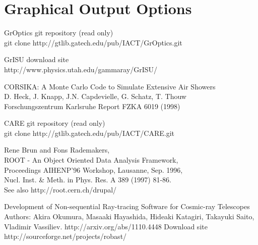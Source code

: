 \documentclass{article}
\begin{document}
\section{Graphical Output Options}\label{S:GRAPH}

\begin{thebibliography}{4}
    GrOptics git repository (read only) \\
    git clone http://gtlib.gatech.edu/pub/IACT/GrOptics.git

    GrISU download site \\
    http://www.physics.utah.edu/gammaray/GrISU/

    CORSIKA: A Monte Carlo Code to Simulate Extensive Air Showers\\
    D. Heck, J. Knapp, J.N. Capdevielle, G. Schatz, T. Thouw \\
    Forschungszentrum Karlsruhe Report FZKA 6019 (1998)

   CARE git repository (read only) \\
   git clone http://gtlib.gatech.edu/pub/IACT/CARE.git

   Rene Brun and Fons Rademakers,\\
   ROOT - An Object Oriented Data Analysis Framework,\\
   Proceedings AIHENP'96 Workshop, Lausanne, Sep. 1996, \\
   Nucl. Inst. \& Meth. in Phys. Res. A 389 (1997) 81-86. \\
   See also http://root.cern.ch/drupal/

   Development of Non-sequential Ray-tracing Software for Cosmic-ray Telescopes
   Authors: Akira Okumura, Masaaki Hayashida, Hideaki Katagiri, Takayuki Saito,
   Vladimir Vassiliev.  http://arxiv.org/abs/1110.4448
   Download site http://sourceforge.net/projects/robast/

\end{thebibliography}
\end{document}
